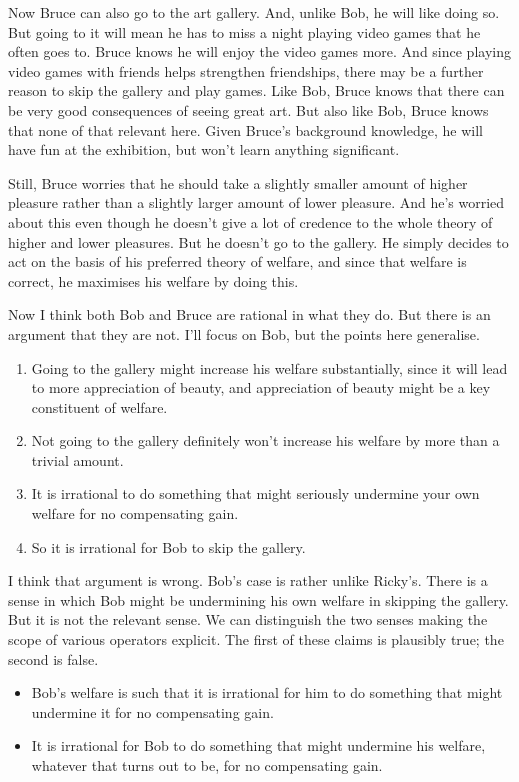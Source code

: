 \documentclass[
  10pt,
  letterpaper,
  DIV=11,
  numbers=noendperiod,
  twoside]{scrartcl}
\providecommand{\tightlist}{%
  \setlength{\itemsep}{0pt}\setlength{\parskip}{0pt}}\usepackage{longtable,booktabs,array}
\begin{document}
Now Bruce can also go to the art gallery. And, unlike Bob, he will like
doing so. But going to it will mean he has to miss a night playing video
games that he often goes to. Bruce knows he will enjoy the video games
more. And since playing video games with friends helps strengthen
friendships, there may be a further reason to skip the gallery and play
games. Like Bob, Bruce knows that there can be very good consequences of
seeing great art. But also like Bob, Bruce knows that none of that
relevant here. Given Bruce's background knowledge, he will have fun at
the exhibition, but won't learn anything significant.

Still, Bruce worries that he should take a slightly smaller amount of
higher pleasure rather than a slightly larger amount of lower pleasure.
And he's worried about this even though he doesn't give a lot of
credence to the whole theory of higher and lower pleasures. But he
doesn't go to the gallery. He simply decides to act on the basis of his
preferred theory of welfare, and since that welfare is correct, he
maximises his welfare by doing this.

Now I think both Bob and Bruce are rational in what they do. But there
is an argument that they are not. I'll focus on Bob, but the points here
generalise.

\begin{enumerate}
\def\labelenumi{\arabic{enumi}.}
\tightlist
\item
  Going to the gallery might increase his welfare substantially, since
  it will lead to more appreciation of beauty, and appreciation of
  beauty might be a key constituent of welfare.
\item
  Not going to the gallery definitely won't increase his welfare by more
  than a trivial amount.
\item
  It is irrational to do something that might seriously undermine your
  own welfare for no compensating gain.
\item
  So it is irrational for Bob to skip the gallery.
\end{enumerate}

I think that argument is wrong. Bob's case is rather unlike Ricky's.
There is a sense in which Bob might be undermining his own welfare in
skipping the gallery. But it is not the relevant sense. We can
distinguish the two senses making the scope of various operators
explicit. The first of these claims is plausibly true; the second is
false.

\begin{itemize}
\tightlist
\item
  Bob's welfare is such that it is irrational for him to do something
  that might undermine it for no compensating gain.
\item
  It is irrational for Bob to do something that might undermine his
  welfare, whatever that turns out to be, for no compensating gain.
\end{itemize}
\end{document}
